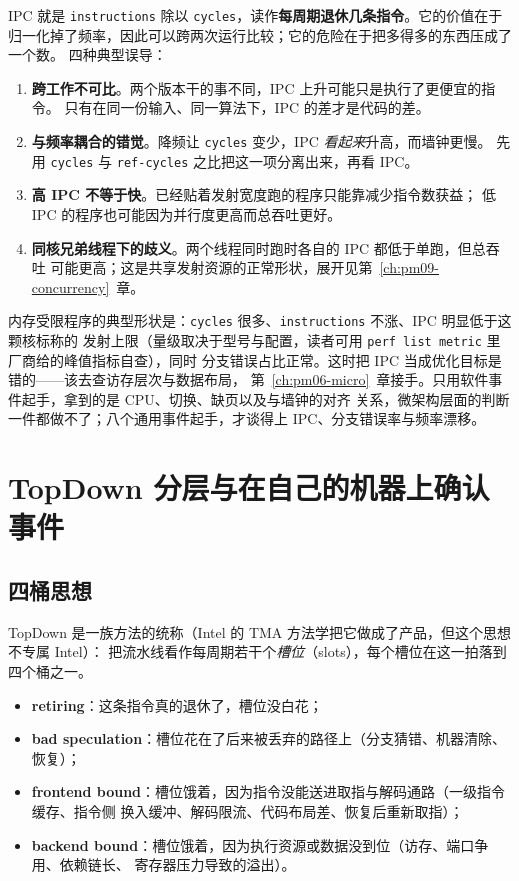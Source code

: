 \documentclass[12pt,a4paper,fontset=fandol]{ctexbook}
\newcommand{\Tp}[1]{\texttt{#1}}
\newcommand{\Lang}[1]{\textsf{#1}}
\newcommand{\MCpu}{\Lang{CPU}}
\newcommand{\Mx}[1]{\textsf{#1}}
\begin{document}
\Mx{IPC} 就是 \Tp{instructions} 除以 \Tp{cycles}，读作\textbf{每周期退休几条指令}。它的价值在于
归一化掉了频率，因此可以跨两次运行比较；它的危险在于把多得多的东西压成了一个数。
四种典型误导：

\begin{enumerate}
  \item \textbf{跨工作不可比}。两个版本干的事不同，\Mx{IPC} 上升可能只是执行了更便宜的指令。
        只有在同一份输入、同一算法下，\Mx{IPC} 的差才是代码的差。
  \item \textbf{与频率耦合的错觉}。降频让 \Tp{cycles} 变少，\Mx{IPC} \emph{看起来}升高，而墙钟更慢。
        先用 \Tp{cycles} 与 \Tp{ref-cycles} 之比把这一项分离出来，再看 \Mx{IPC}。
  \item \textbf{高 \Mx{IPC} 不等于快}。已经贴着发射宽度跑的程序只能靠减少指令数获益；
        低 \Mx{IPC} 的程序也可能因为并行度更高而总吞吐更好。
  \item \textbf{同核兄弟线程下的歧义}。两个线程同时跑时各自的 \Mx{IPC} 都低于单跑，但总吞吐
        可能更高；这是共享发射资源的正常形状，展开见第~\ref{ch:pm09-concurrency}~章。
\end{enumerate}

内存受限程序的典型形状是：\Tp{cycles} 很多、\Tp{instructions} 不涨、\Mx{IPC} 明显低于这颗核标称的
发射上限（量级取决于型号与配置，读者可用 \Tp{perf list metric} 里厂商给的峰值指标自查），同时
分支错误占比正常。这时把 \Mx{IPC} 当成优化目标是错的——该去查访存层次与数据布局，
第~\ref{ch:pm06-micro}~章接手。只用软件事件起手，拿到的是 \MCpu{}、切换、缺页以及与墙钟的对齐
关系，微架构层面的判断一件都做不了；八个通用事件起手，才谈得上 \Mx{IPC}、分支错误率与频率漂移。

\section{TopDown 分层与在自己的机器上确认事件}
\label{sec:pm05-topdown}

\subsection*{四桶思想}

TopDown 是一族方法的统称（Intel 的 TMA 方法学把它做成了产品，但这个思想不专属 Intel）：
把流水线看作每周期若干个\emph{槽位}（slots），每个槽位在这一拍落到四个桶之一。

\begin{itemize}
  \item \textbf{retiring}：这条指令真的退休了，槽位没白花；
  \item \textbf{bad speculation}：槽位花在了后来被丢弃的路径上（分支猜错、机器清除、恢复）；
  \item \textbf{frontend bound}：槽位饿着，因为指令没能送进取指与解码通路（一级指令缓存、指令侧
        换入缓冲、解码限流、代码布局差、恢复后重新取指）；
  \item \textbf{backend bound}：槽位饿着，因为执行资源或数据没到位（访存、端口争用、依赖链长、
        寄存器压力导致的溢出）。
\end{itemize}
\end{document}
